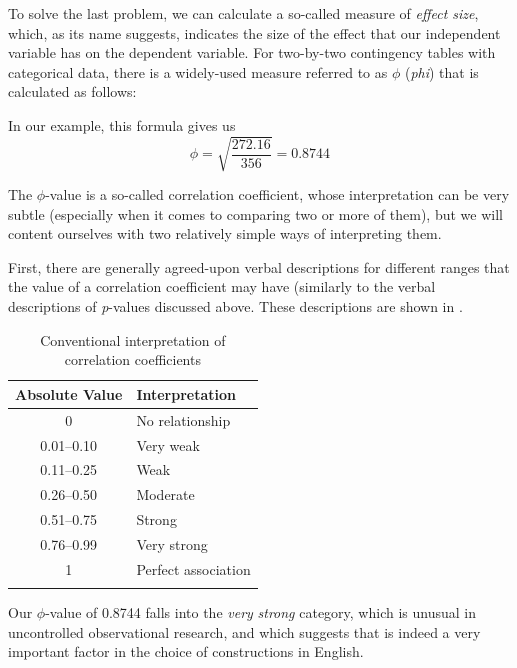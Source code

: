 To solve the last problem, we can calculate a so\hyp{}called measure of \textit{effect size},  which, as its name suggests, indicates the size of the effect that our independent variable has on the dependent variable. For two\hyp{}by\hyp{}two contingency  tables with categorical  data, there is a widely\hyp{}used measure referred to as $\phi$ (\textit{phi}) that is calculated as follows:\largerpage[1]

\begin{exe}
\ex {}
\end{exe}

In our example, this formula gives us
\[\phi = \sqrt{\frac{272.16}{356}} = 0.8744\]

The $\phi$-value is a so\hyp{}called correlation  coefficient, whose interpretation can be very subtle (especially when it comes to comparing two or more of them), but we will content ourselves with two relatively simple ways of interpreting them.

First, there are generally agreed\hyp{}upon verbal descriptions for different ranges that the value of a correlation  coefficient may have (similarly to the verbal descriptions of \textit{p}-values discussed above. These descriptions are shown in .

\begin{table}
\caption{Conventional interpretation of correlation coefficients\label{tab:correlationlevels}}
\begin{tabular}[t]{cl}
\lsptoprule
Absolute Value & Interpretation \\
\midrule
0 & No relationship \\
0.01--0.10 & Very weak \\
0.11--0.25 & Weak \\
0.26--0.50 & Moderate \\
0.51--0.75 & Strong \\
0.76--0.99 & Very strong \\
1 & Perfect association \\
\lspbottomrule
\end{tabular}
\end{table}

Our $\phi$-value of 0.8744 falls into the \textit{very} \textit{strong} category, which is unusual in uncontrolled observational  research, and which suggests that  is indeed a very important factor in the choice of   constructions in English.\largerpage

